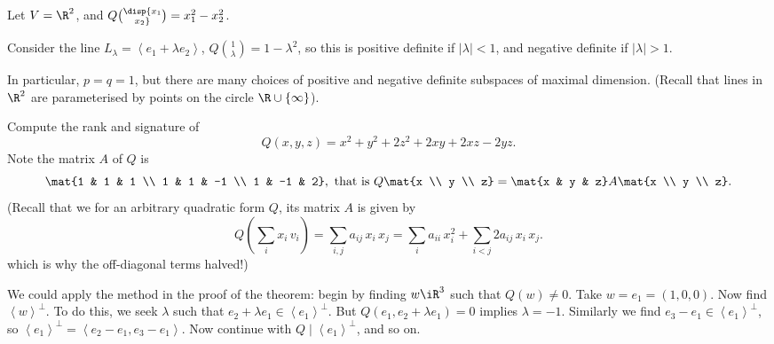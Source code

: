 \vspace{-12pt}

\begin{example}
	Let $V=\R^2$, and $Q\disp{x_1 \choose x_2} = x_1^2-x_2^2$. %
	
	Consider the line $L_\lambda = \left\langle e_1+\lambda e_2 \right\rangle$, $Q{1 \choose \lambda} = 1-\lambda^2$, so this is positive definite if $\left\vert \lambda \right\vert<1$, and negative definite if $\left\vert \lambda \right\vert>1$. %
	
	In particular, $p=q=1$, but there are many choices of positive and negative definite subspaces of maximal dimension. (Recall that lines in $\R^2$ are 
parameterised by points on the circle $\R\cup\{\infty\}$).
\end{example}

\begin{example}
	Compute the rank and signature of %
	\begin{equation*}
		Q(x,y,z) = x^2+y^2 + 2z^2 + 2xy +2 xz - 2yz.
	\end{equation*}
	Note the matrix $A$ of $Q$ is
	\begin{equation*}
		\mat{1 & 1 & 1 \\ 1 & 1 & -1 \\ 1 & -1 & 2},
		\text{ that is }
		Q\mat{x \\ y \\ z} = \mat{x & y & z} A \mat{x \\ y \\ z}.
	\end{equation*}
	(Recall that we for an arbitrary quadratic form $Q$, its matrix $A$ is given by
	\begin{equation*}
		\textstyle Q\left( \sum_i x_i \, v_i \right)
		= \sum_{i,j} a_{ij}\,x_i\,x_j
		= \sum_i a_{ii}\,x_i^2
		+ \sum_{i<j} 2a_{ij} \,x_i\,x_j.
	\end{equation*}
	which is why the off-diagonal terms halved!)

	We could apply the method in the proof of the theorem: begin by finding $w\iR^3$ such that $Q(w)\neq 0$. Take $w=e_1=(1,0,0)$. Now find $\left\langle w \right\rangle^\perp$. To do this, we seek $\lambda$ such that $e_2+\lambda e_1 \in \left\langle e_1 \right\rangle^\perp$. But $Q(e_1,e_2+\lambda e_1)=0$ implies $\lambda=-1$. Similarly we find  $e_3-e_1 \in \left\langle e_1 \right\rangle^\perp$, so $\left\langle e_1 \right\rangle^\perp = \left\langle e_2-e_1, e_3-e_1 \right\rangle$. Now continue with $Q\mid \left\langle e_1 \right\rangle^\perp$, and so on. %
	

\end{example}
